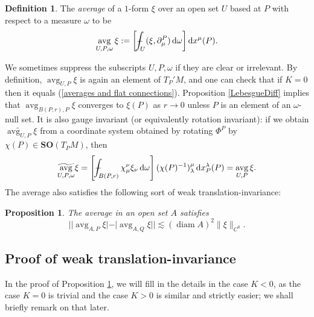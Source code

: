 \documentclass[final,12pt, leqno]{brownthesis}
\newcommand{\SpOrth}{\mathbf{SO}}
\DeclareMathOperator{\avg}{avg}
\DeclareMathOperator{\diam}{diam}
\newcommand*\dif{\mathop{}\!\mathrm{d}}
\newcommand{\dfn}[1]{\emph{#1}\index{#1}}
\newtheorem{proposition}[theorem]{Proposition}
\theoremstyle{definition}
\newtheorem{definition}[theorem]{Definition}
\numberwithin{equation}{section}
\def\Xint#1{\mathchoice
{\XXint\displaystyle\textstyle{#1}}%
{\XXint\textstyle\scriptstyle{#1}}%
{\XXint\scriptstyle\scriptscriptstyle{#1}}%
{\XXint\scriptscriptstyle\scriptscriptstyle{#1}}%
\!\int}
\def\XXint#1#2#3{{\setbox0=\hbox{$#1{#2#3}{\int}$ }
\vcenter{\hbox{$#2#3$ }}\kern-.6\wd0}}
\def\dashint{\Xint-}
\begin{document}
\begin{definition}
The \dfn{average} of a $1$-form $\xi$ over an open set $U$ based at $P$ with respect to a measure $\omega$ to be
$$\avg_{U, P, \omega} \xi := \left[\dashint_U (\xi, \partial^P_\mu) \dif \omega\right] \dif x^\mu(P).$$
\end{definition}

We sometimes suppress the subscripts $U, P, \omega$ if they are clear or irrelevant.
By definition, $\avg_{U, P} \xi$ is again an element of $T_P'M$, and one can check that if $K = 0$ then it equals (\ref{averages and flat connections}).
Proposition \ref{LebesgueDiff} implies that $\avg_{B(P, r), P} \xi$ converges to $\xi(P)$ as $r \to 0$ unless $P$ is an element of an $\omega$-null set.
It is also gauge invariant (or equivalently rotation invariant): if we obtain $\widetilde{\avg_{U, P}} \xi$ from a coordinate system obtained by rotating $\Phi^P$ by $\chi(P) \in \SpOrth(T_PM)$, then
$$\widetilde{\avg_{U, P, \omega}} \xi = \left[\dashint_{B(P, r)} \chi^\nu_\mu \xi_\nu \dif \omega\right] (\chi(P)^{-1})_\lambda^\mu \dif x^\lambda_P(P) = \avg_{U, P} \xi.$$
The average also satisfies the following sort of weak translation-invariance:

\begin{proposition}\label{translation invariance}
The average in an open set $A$ satisfies
$$||\avg_{A, P} \xi| - |\avg_{A, Q} \xi|| \lesssim (\diam A)^2 \|\xi\|_{C^0}.$$
\end{proposition}

\subsection{Proof of weak translation-invariance}
In the proof of Proposition \ref{translation invariance}, we will fill in the details in the case $K < 0$, as the case $K = 0$ is trivial and the case $K > 0$ is similar and strictly easier; we shall briefly remark on that later.
\end{document}
